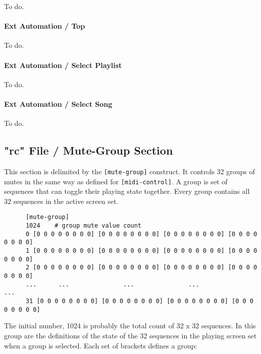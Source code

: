    To do.

\paragraph{Ext Automation / Top}
\label{paragraph:seq64_rc_file_midi_ctrl_ex_top}

   To do.

\paragraph{Ext Automation / Select Playlist}
\label{paragraph:seq64_rc_file_midi_ctrl_ex_sellist}

   To do.

\paragraph{Ext Automation / Select Song}
\label{paragraph:seq64_rc_file_midi_ctrl_ex_selsong}

   To do.

\subsection{"rc" File / Mute-Group Section}
\label{subsec:seq64_rc_file_mute_group}
     
   This section is delimited by the \texttt{[mute-group]} construct.
   It controls 32 groups of mutes in the same way as defined for
   \texttt{[midi-control]}. A group is set of sequences that can toggle their
   playing state together.  Every group contains all 32 sequences in the
   active screen set.

   \begin{verbatim}
      [mute-group]
      1024    # group mute value count
      0 [0 0 0 0 0 0 0 0] [0 0 0 0 0 0 0 0] [0 0 0 0 0 0 0 0] [0 0 0 0 0 0 0 0]
      1 [0 0 0 0 0 0 0 0] [0 0 0 0 0 0 0 0] [0 0 0 0 0 0 0 0] [0 0 0 0 0 0 0 0]
      2 [0 0 0 0 0 0 0 0] [0 0 0 0 0 0 0 0] [0 0 0 0 0 0 0 0] [0 0 0 0 0 0 0 0]
      ...      ...               ...               ...               ...
      31 [0 0 0 0 0 0 0 0] [0 0 0 0 0 0 0 0] [0 0 0 0 0 0 0 0] [0 0 0 0 0 0 0 0]
   \end{verbatim}

   The initial number, 1024 is probably the total count of 32 x 32 sequences.
   In this group are the definitions of the state of the 32 sequences
   in the playing screen set when a group is selected.
   Each set of brackets defines a group:
   
